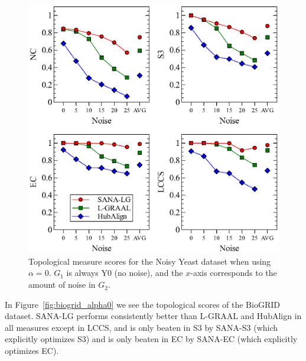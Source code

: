 \documentclass{bioinfo}
\begin{document}
\begin{figure}
\centering
\includegraphics[width=0.99\linewidth]{syeastBeta0.eps}
\caption{Topological measure scores for the Noisy Yeast dataset when using $\alpha=0$. $G_1$ is always Y0 (no noise), and the $x$-axis corresponds to the amount of noise in $G_2$.}
\label{fig:syntheticyeast}
\end{figure}

In Figure~\ref{fig:biogrid_alpha0} we see the topological scores of the BioGRID dataset. SANA-LG performs consistently better than L-GRAAL and HubAlign in all measures except in LCCS, and is only beaten in S3 by SANA-S3 (which explicitly optimizes S3) and is only beaten in EC by SANA-EC (which explicitly optimizes EC).
\end{document}
